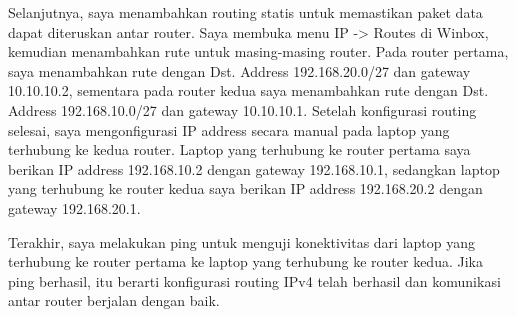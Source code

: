 Selanjutnya, saya menambahkan routing statis untuk memastikan paket data dapat diteruskan antar router. Saya membuka menu IP -> Routes di Winbox, kemudian menambahkan rute untuk masing-masing router. Pada router pertama, saya menambahkan rute dengan Dst. Address 192.168.20.0/27 dan gateway 10.10.10.2, sementara pada router kedua saya menambahkan rute dengan Dst. Address 192.168.10.0/27 dan gateway 10.10.10.1. Setelah konfigurasi routing selesai, saya mengonfigurasi IP address secara manual pada laptop yang terhubung ke kedua router. Laptop yang terhubung ke router pertama saya berikan IP address 192.168.10.2 dengan gateway 192.168.10.1, sedangkan laptop yang terhubung ke router kedua saya berikan IP address 192.168.20.2 dengan gateway 192.168.20.1. 

Terakhir, saya melakukan ping untuk menguji konektivitas dari laptop yang terhubung ke router pertama ke laptop yang terhubung ke router kedua. Jika ping berhasil, itu berarti konfigurasi routing IPv4 telah berhasil dan komunikasi antar router berjalan dengan baik.

\newpage
